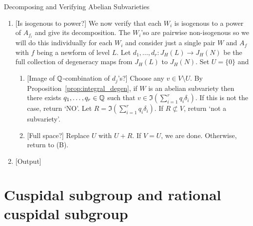 \begin{algorithm}{Decomposing and Verifying Abelian Subvarieties}
\begin{enumerate}
\begin{enumerate}
                \item{} [Compare with newforms]
                    Let $S_{j,k}$ be the set of newforms whose $\ell$th Fourier
                    coefficient agrees with the eigenvalue of $T_\ell$ on
                    $U_{j, k}$ for $l=1,\ldots,j$. If $S_{j, k}$ is empty for
                    any $k=1,\ldots,n_j$, return `not a subvariety'. If $S_{j,k}$ is not
                    singleton for any $k=1,\ldots, n_j$, increment $j$ and
                    return to (b). Otherwise, $S_{j,k}$ is singleton for all
                    $k$ so let $S_{j,k}=\{f_k\}$ and $W_k=U_{j,k}$.
            \end{enumerate}
        \item{} [Is isogenous to power?]
            We now verify that each $W_i$ is isogenous to a power of $A_{f_i}$
            and give its decomposition. The $W_i$'so are pairwise non-isogenous
            so we will do this individually for each $W_i$ and consider just a
            single pair $W$ and $A_f$ with $f$ being a newform of level $L$.
            Let $d_1,\ldots,d_r:J_H(L)\to J_H(N)$ be the full collection of
            degeneracy maps from $J_H(L)$ to $J_H(N)$. Set $U=\{0\}$ and 
            \begin{enumerate}
                \item{} [Image of $\mathbb{Q}$-combination of $d_j$'s?]
                    Choose any $v\in V\setminus U$. By
                    Proposition~\ref{prop:integral_degen}, if $W$ is an abelian
                    subvariety then there exists $q_1,\ldots,q_r\in \mathbb{Q}$
                    such that $v\in \Im \left(\sum_{i=1} ^r q_i
                    \delta_i\right)$. If this is not the case, return
                    `NO'. Let $R = \Im \left(\sum_{i=1} ^r q_i
                    \delta_i\right)$. If $R\not\subset V$, return `not a
                    subvariety'.
                \item{} [Full space?]
                    Replace $U$ with $U+R$. If $V=U$, we are done. Otherwise,
                    return to (B).
            \end{enumerate}
        \item{} [Output]
    \end{enumerate}
\end{algorithm}

\section{Cuspidal subgroup and rational cuspidal subgroup}%
\label{sec:cuspidal_subgroup}


